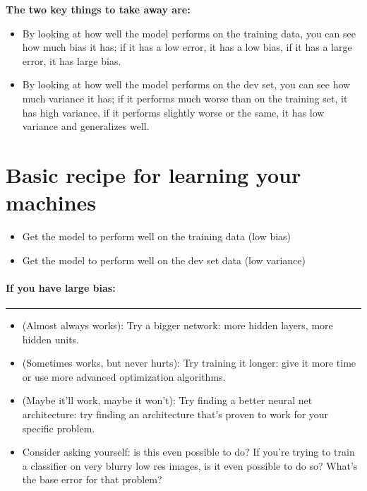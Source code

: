 \documentclass[
]{article}
\begin{document}
\textbf{The two key things to take away are:}

\begin{itemize}
\item
  By looking at how well the model performs on the training data, you
  can see how much bias it has; if it has a low error, it has a low
  bias, if it has a large error, it has large bias.
\item
  By looking at how well the model performs on the dev set, you can see
  how much variance it has; if it performs much worse than on the
  training set, it has high variance, if it performs slightly worse or
  the same, it has low variance and generalizes well.
\end{itemize}

\hypertarget{header-n53}{%
\section{Basic recipe for learning your machines}\label{header-n53}}

\begin{itemize}
\item
  Get the model to perform well on the training data (low bias)
\item
  Get the model to perform well on the dev set data (low variance)
\end{itemize}

\hypertarget{header-n59}{%
\paragraph{\texorpdfstring{\textbf{If you have large
bias:}}{If you have large bias:}}\label{header-n59}}

\begin{center}\rule{0.5\linewidth}{0.5pt}\end{center}

\begin{itemize}
\item
  (Almost always works): Try a bigger network: more hidden layers, more
  hidden units.
\item
  (Sometimes works, but never hurts): Try training it longer: give it
  more time or use more advanced optimization algorithms.
\item
  (Maybe it'll work, maybe it won't): Try finding a better neural net
  architecture: try finding an architecture that's proven to work for
  your specific problem.
\item
  Consider asking yourself: is this even possible to do? If you're
  trying to train a classifier on very blurry low res images, is it even
  possible to do so? What's the base error for that problem?
\end{itemize}
\end{document}
